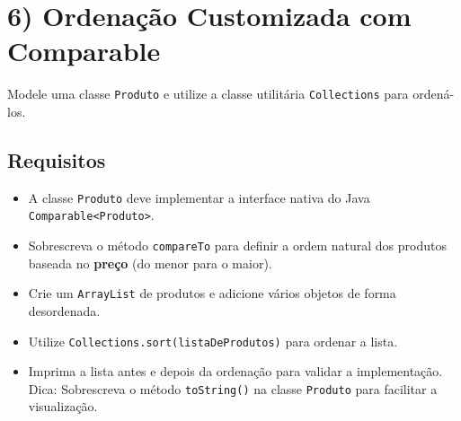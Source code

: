 \documentclass[12pt]{article}
\begin{document}
\section*{6) Ordenação Customizada com Comparable}
Modele uma classe \texttt{Produto} e utilize a classe utilitária \texttt{Collections} para ordená-los.

\begin{center}
\end{center}

\subsection*{Requisitos}
\begin{itemize}
    \item A classe \texttt{Produto} deve implementar a interface nativa do Java \texttt{Comparable<Produto>}.
    \item Sobrescreva o método \texttt{compareTo} para definir a ordem natural dos produtos baseada no \textbf{preço} (do menor para o maior).
    \item Crie um \texttt{ArrayList} de produtos e adicione vários objetos de forma desordenada.
    \item Utilize \texttt{Collections.sort(listaDeProdutos)} para ordenar a lista.
    \item Imprima a lista antes e depois da ordenação para validar a implementação. Dica: Sobrescreva o método \texttt{toString()} na classe \texttt{Produto} para facilitar a visualização.
\end{itemize}
\end{document}
